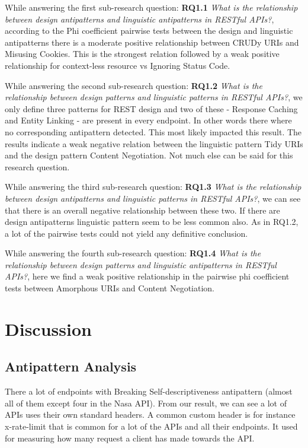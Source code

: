 \documentclass[a4paper,12pt]{article}
\begin{document}
While answering the first sub-research question: \textbf{RQ1.1} \textit{What is the relationship between design antipatterns and linguistic antipatterns in RESTful APIs?}, according to the Phi coefficient pairwise tests between the design and linguistic antipatterns there is a moderate positive relationship between CRUDy URIs and Misusing Cookies. This is the strongest relation followed by a weak positive relationship for context-less resource vs Ignoring Status Code.

While answering the second sub-research question: \textbf{RQ1.2} \textit{What is the relationship between design patterns and linguistic patterns in RESTful APIs?}, we only define three patterns for REST design and two of these - Response Caching and  Entity Linking - are present in every endpoint. In other words there where no corresponding antipattern detected. This most likely impacted this result. The results indicate a weak negative relation between the linguistic pattern Tidy URIs and the design pattern Content Negotiation. Not much else can be said for this research question.

While answering the third sub-research question: \textbf{RQ1.3} \textit{What is the relationship between design antipatterns and linguistic patterns in RESTful APIs?}, we can see that there is an overall negative relationship between these two. If there are design antipatterns linguistic pattern seem to be less common also. As in RQ1.2, a lot of the pairwise tests could not yield any definitive conclusion.

While answering the fourth sub-research question: \textbf{RQ1.4}\textit{ What is the relationship between design patterns and linguistic antipatterns in RESTful APIs?}, here we find a weak positive relationship in the pairwise phi coefficient tests between Amorphous URIs and Content Negotiation.

\newpage
	
\section{Discussion}

\subsection{Antipattern Analysis}

There a lot of endpoints with Breaking Self-descriptiveness antipattern (almost all of them except four in the Nasa API). From our result, we can see a lot of APIs uses their own standard headers. A common custom header is for instance x-rate-limit that is common for a lot of the APIs and all their endpoints. It used for measuring how many request a client has made towards the API. 
\end{document}
